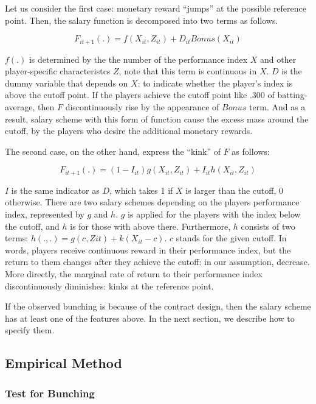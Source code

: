 \documentclass[dvipdfmx, 12pt]{article}
\begin{document}
\vspace{1zw}

Let us consider the first case: monetary reward ``jumps'' at the possible reference point. Then, the salary function is decomposed into two terms as follows.

\[
F_{it+1}(.) = f(X_{it}, Z_{it}) + D_{it} \textit{Bonus}(X_{it})
\]

$f(.)$ is determined by the the number of the performance index $X$ and other player-specific characteristcs $Z$, note that this term is continuous in $X$. $D$ is the dummy variable that depends on $X$: to indicate whether the player's index is above the cutoff point. If the players achieve the cutoff point like .300 of batting-average, then $F$ discontinuously rise by the appearance of $\textit{Bonus}$ term. And as a result, salary scheme with this form of function cause the excess mass around the cutoff, by the players who desire the additional monetary rewards.

The second case, on the other hand, express the ``kink'' of $F$ as follows:

\[
F_{it+1}(.) = (1-I_{it})g(X_{it}, Z_{it}) + I_{it}h(X_{it}, Z_{it})
\]

$I$ is the same indicator as $D$, which takes 1 if $X$ is larger than the cutoff, 0 otherwise. There are two salary schemes depending on the players performance index, represented by $g$ and $h$. $g$ is applied for the players with the index below the cutoff, and $h$ is for those with above there. Furthermore, $h$ consists of two terms: $h(.,.) = g(c, Z{it}) + k(X_{it}-c)$. $c$ stands for the given cutoff. In words, players receive continuous reward in their performance index, but the return to them changes after they achieve the cutoff: in our assumption, decrease. More directly, the marginal rate of return to their performance index discontinuously diminishes: kinks at the reference point.

If the observed bunching is because of the contract design, then the salary scheme has at least one of the features above. In the next section, we describe how to specify them.

 \subsection{Empirical Method}

  \subsubsection{Test for Bunching}
\end{document}
